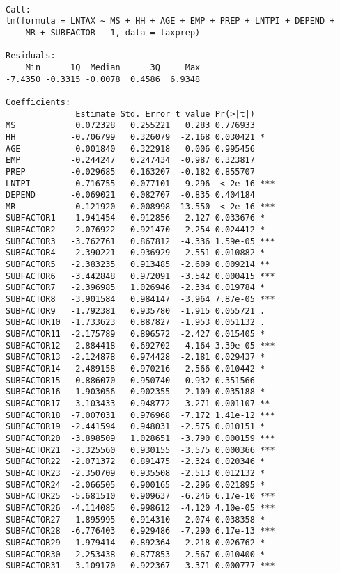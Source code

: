 \documentclass[]{book}
\begin{document}
\begin{verbatim}

Call:
lm(formula = LNTAX ~ MS + HH + AGE + EMP + PREP + LNTPI + DEPEND + 
    MR + SUBFACTOR - 1, data = taxprep)

Residuals:
    Min      1Q  Median      3Q     Max 
-7.4350 -0.3315 -0.0078  0.4586  6.9348 

Coefficients:
              Estimate Std. Error t value Pr(>|t|)    
MS            0.072328   0.255221   0.283 0.776933    
HH           -0.706799   0.326079  -2.168 0.030421 *  
AGE           0.001840   0.322918   0.006 0.995456    
EMP          -0.244247   0.247434  -0.987 0.323817    
PREP         -0.029685   0.163207  -0.182 0.855707    
LNTPI         0.716755   0.077101   9.296  < 2e-16 ***
DEPEND       -0.069021   0.082707  -0.835 0.404184    
MR            0.121920   0.008998  13.550  < 2e-16 ***
SUBFACTOR1   -1.941454   0.912856  -2.127 0.033676 *  
SUBFACTOR2   -2.076922   0.921470  -2.254 0.024412 *  
SUBFACTOR3   -3.762761   0.867812  -4.336 1.59e-05 ***
SUBFACTOR4   -2.390221   0.936929  -2.551 0.010882 *  
SUBFACTOR5   -2.383235   0.913485  -2.609 0.009214 ** 
SUBFACTOR6   -3.442848   0.972091  -3.542 0.000415 ***
SUBFACTOR7   -2.396985   1.026946  -2.334 0.019784 *  
SUBFACTOR8   -3.901584   0.984147  -3.964 7.87e-05 ***
SUBFACTOR9   -1.792381   0.935780  -1.915 0.055721 .  
SUBFACTOR10  -1.733623   0.887827  -1.953 0.051132 .  
SUBFACTOR11  -2.175789   0.896572  -2.427 0.015405 *  
SUBFACTOR12  -2.884418   0.692702  -4.164 3.39e-05 ***
SUBFACTOR13  -2.124878   0.974428  -2.181 0.029437 *  
SUBFACTOR14  -2.489158   0.970216  -2.566 0.010442 *  
SUBFACTOR15  -0.886070   0.950740  -0.932 0.351566    
SUBFACTOR16  -1.903056   0.902355  -2.109 0.035188 *  
SUBFACTOR17  -3.103433   0.948772  -3.271 0.001107 ** 
SUBFACTOR18  -7.007031   0.976968  -7.172 1.41e-12 ***
SUBFACTOR19  -2.441594   0.948031  -2.575 0.010151 *  
SUBFACTOR20  -3.898509   1.028651  -3.790 0.000159 ***
SUBFACTOR21  -3.325560   0.930155  -3.575 0.000366 ***
SUBFACTOR22  -2.071372   0.891475  -2.324 0.020346 *  
SUBFACTOR23  -2.350709   0.935508  -2.513 0.012132 *  
SUBFACTOR24  -2.066505   0.900165  -2.296 0.021895 *  
SUBFACTOR25  -5.681510   0.909637  -6.246 6.17e-10 ***
SUBFACTOR26  -4.114085   0.998612  -4.120 4.10e-05 ***
SUBFACTOR27  -1.895995   0.914310  -2.074 0.038358 *  
SUBFACTOR28  -6.776403   0.929486  -7.290 6.17e-13 ***
SUBFACTOR29  -1.979414   0.892364  -2.218 0.026762 *  
SUBFACTOR30  -2.253438   0.877853  -2.567 0.010400 *  
SUBFACTOR31  -3.109170   0.922367  -3.371 0.000777 ***

\end{verbatim}
\end{document}
